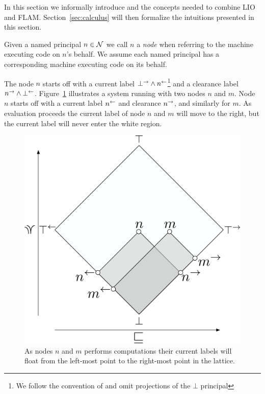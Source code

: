 In this section we informally introduce \lang{} and the concepts needed to combine LIO and FLAM. Section~\ref{sec:calculus} will then formalize the intuitions presented in this section.

Given a named principal $n \in \mathcal{N}$ we call $n$ a \emph{node} when referring to the machine executing code on $n$'s behalf. We assume each named principal has a corresponding machine executing code on its behalf.

The node $n$ starts off with a current label $\bot^{\rightarrow} \wedge n^{\leftarrow}$\footnote{We follow the convention of \cite{Arden:2015:FA:2859845.2859998} and omit projections of the $\bot$ principal} and a clearance label $n^{\rightarrow} \wedge \bot^{\leftarrow}$. Figure~\ref{fig:node-info-flow} illustrates a system running \lang{} with two nodes $n$ and $m$. Node $n$ starts off with a current label $n^{\leftarrow}$ and clearance $n^{\rightarrow}$, and similarly for $m$. As evaluation proceeds the current label of node $n$ and $m$ will move to the right, but the current label will never enter the white region.

\begin{figure}
    \centering
    \includegraphics[scale=0.25]{Illustrations/multi-node.pdf}
    \caption{As nodes $n$ and $m$ performs computations their current labels will float from the left-most point to the right-most point in the lattice.}
    \label{fig:node-info-flow}
\end{figure}

